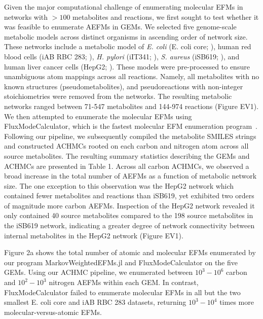 \documentclass[12pt]{article}
\begin{document}
Given the major computational challenge of enumerating molecular EFMs in
networks with $>100$ metabolites and reactions, we first sought to test
whether it was feasible to enumerate AEFMs in GEMs. We selected five
genome-scale metabolic models across distinct organisms in ascending order
of network size. These networks include a metabolic model of \textit{E.
coli} (E. coli core; \cite{OrthJeffreyD2010RaUoDATASET}), human red blood
cells (iAB RBC 283; \cite{BordbarAarash2011iApdDATASET}), \textit{H.
pylori} (iIT341; \cite{ThieleInes2005EMRoDATASET}), \textit{S. aureus}
(iSB619; \cite{BeckerScottA2005GrotDATASET}), and human liver cancer cells
(HepG2; \cite{NilssonAvlant2020QaoaDATASET}). These models were
pre-processed to ensure unambiguous atom mappings across all reactions.
Namely, all metabolites with no known structures (pseudometabolites), and
pseudoreactions with non-integer stoichiometries were removed from the
networks. The resulting metabolic networks ranged between 71-547
metabolites and 144-974 reactions (Figure EV1). We then attempted to
enumerate the molecular EFMs using FluxModeCalculator, which is the
fastest molecular EFM enumeration
program~\citep{vanKlinkenJanBert2016Faet}. Following our pipeline, we
subsequently compiled the metabolite SMILES strings and constructed ACHMCs
rooted on each carbon and nitrogen atom across all source metabolites. The
resulting summary statistics describing the GEMs and ACHMCs are presented
in Table 1. Across all carbon ACHMCs, we observed a broad increase in the
total number of AEFMs as a function of metabolic network size. The one
exception to this observation was the HepG2 network which contained fewer
metabolites and reactions than iSB619, yet exhibited two orders of
magnitude more carbon AEFMs. Inspection of the HepG2 network revealed it
only contained 40 source metabolites compared to the 198 source
metabolites in the iSB619 network, indicating a greater degree of network
connectivity between internal metabolites in the HepG2 network (Figure
EV1).


Figure 2a shows the total number of atomic and molecular EFMs enumerated
by our program MarkovWeightedEFMs.jl and FluxModeCalculator on the five
GEMs. Using our ACHMC pipeline, we enumerated between $10^3 - 10^6$ carbon
and $10^2-10^3$ nitrogen AEFMs within each GEM. In contrast, FluxModeCalculator
failed to enumerate molecular EFMs in all but the two smallest E. coli
core and iAB RBC 283 datasets, returning $10^3 - 10^4$ times more
molecular-versus-atomic EFMs. 
\end{document}
